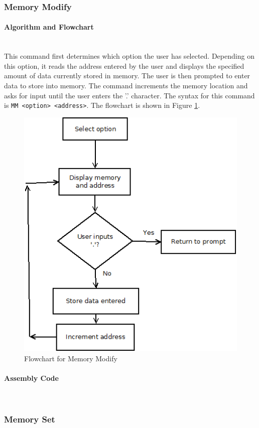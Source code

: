 \documentclass[12pt]{article}
\begin{document}
			\subsubsection{Memory Modify}
			
			\paragraph{Algorithm and Flowchart}~\\
			This command first determines which option the user has selected. Depending on this option, it reads the address entered by the user and displays the specified amount of data currently stored in memory. The user is then prompted to enter data to store into memory. The command increments the memory location and asks for input until the user enters the '.' character. The syntax for this command is \texttt{MM <option> <address>}. The flowchart is shown in Figure \ref{fig:MM}.
			
\begin{figure}[H]
\centering
\includegraphics[width=0.7\linewidth]{MM}
\caption{Flowchart for Memory Modify}
\label{fig:MM}
\end{figure}
			\paragraph{Assembly Code}~\\
			
			
			\subsubsection{Memory Set}
\end{document}
